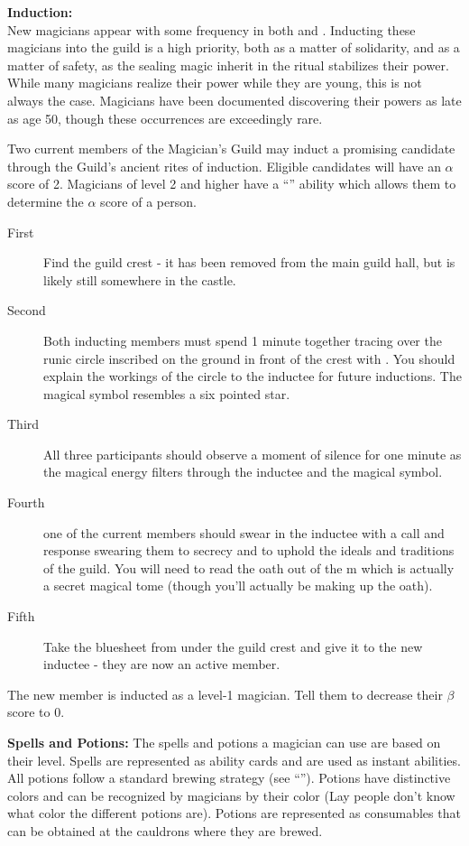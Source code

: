 \documentclass[blue]{NeptuneBall}
\begin{document}
{\bf Induction:}\\
New magicians appear with some frequency in both \pPacifica{} and \pAtlantis{}. Inducting these magicians into the guild is a high priority, both as a matter of solidarity, and as a matter of safety, as the sealing magic inherit in the ritual stabilizes their power. While many magicians realize their power while they are young, this is not always the case. Magicians have been documented discovering their powers as late as age 50, though these occurrences are exceedingly rare.

Two current members of the Magician's Guild may induct a promising candidate through the Guild's ancient rites of induction. Eligible candidates will have an $\alpha$ score of 2. Magicians of level 2 and higher have a ``\aPerceive{}'' ability which allows them to determine the $\alpha$ score of a person.
\begin{description}
\item[First] Find the guild crest - it has been removed from the main guild hall, but is likely still somewhere in the castle. 
\item[Second] Both inducting members must spend 1 minute together tracing over the runic circle inscribed on the ground in front of the crest with \iChalk{}. You should explain the workings of the circle to the inductee for future inductions. The magical symbol resembles a six pointed star. 
\item[Third] All three participants should observe a moment of silence for one minute as the magical energy filters through the inductee and the magical symbol. \item[Fourth] one of the current members should swear in the inductee with a call and response swearing them to secrecy and to uphold the ideals and traditions of the guild. You will need to read the oath out of the \iBook{}m which is actually a secret magical tome (though you'll actually be making up the oath). 
\item[Fifth] Take the bluesheet from under the guild crest and give it to the new inductee - they are now an active member.
\end{description}

The new member is inducted as a level-1 magician. Tell them to decrease their $\beta$ score to 0.

{\bf Spells and Potions:}
The spells and potions a magician can use are based on their level. Spells are represented as ability cards and are used as instant abilities. All potions follow a standard brewing strategy (see ``\gPotions{}''). Potions have distinctive colors and can be recognized by magicians by their color (Lay people don't know what color the different potions are). Potions are represented as consumables that can be obtained at the cauldrons where they are brewed.
\end{document}
